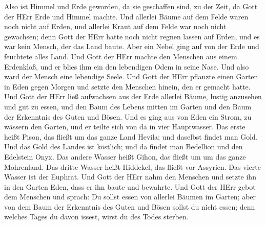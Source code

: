  Also ist Himmel und Erde geworden, da sie geschaffen sind,
zu der Zeit, da Gott der HErr Erde und Himmel machte.  Und
allerlei Bäume auf dem Felde waren noch nicht auf Erden, und allerlei
Kraut auf dem Felde war noch nicht gewachsen; denn Gott der HErr hatte
noch nicht regnen lassen auf Erden, und es war kein Mensch, der das Land
baute.  Aber ein Nebel ging auf von der Erde und feuchtete
alles Land.  Und Gott der HErr machte den Menschen aus einem
Erdenkloß, und er blies ihm ein den lebendigen Odem in seine Nase. Und
also ward der Mensch eine lebendige Seele.  Und Gott der
HErr pflanzte einen Garten in Eden gegen Morgen und setzte den Menschen
hinein, den er gemacht hatte.  Und Gott der HErr ließ
aufwachsen aus der Erde allerlei Bäume, lustig anzusehen und gut zu
essen, und den Baum des Lebens mitten im Garten und den Baum der
Erkenntnis des Guten und Bösen.  Und es ging aus von Eden
ein Strom, zu wässern den Garten, und er teilte sich von da in vier
Hauptwasser.  Das erste heißt Pison, das fließt um das
ganze Land Hevila; und daselbst findet man Gold.  Und das
Gold des Landes ist köstlich; und da findet man Bedellion und den
Edelstein Onyx.  Das andere Wasser heißt Gihon, das fließt
um um das ganze Mohrenland.  Das dritte Wasser heißt
Hiddekel, das fließt vor Assyrien. Das vierte Wasser ist der Euphrat.
 Und Gott der HErr nahm den Menschen und setzte ihn in den
Garten Eden, dass er ihn baute und bewahrte.  Und Gott der
HErr gebot dem Menschen und sprach: Du sollst essen von allerlei Bäumen
im Garten;  aber von dem Baum der Erkenntnis des Guten und
Bösen sollst du nicht essen; denn welches Tages du davon issest, wirst
du des Todes sterben.

